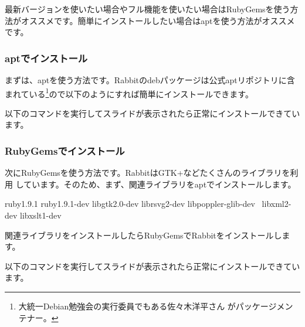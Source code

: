 \documentclass[mingoth,a4paper]{jsarticle}
\begin{document}
最新バージョンを使いたい場合やフル機能を使いたい場合はRubyGemsを使う方
法がオススメです。簡単にインストールしたい場合はaptを使う方法がオススメ
です。

\subsubsection{aptでインストール}

まずは、aptを使う方法です。Rabbitのdebパッケージは公式aptリポジトリに含
まれている\footnote{大統一Debian勉強会の実行委員でもある佐々木洋平さん
がパッケージメンテナー。}ので以下のようにすれば簡単にインストールできます。

\begin{commandline}
\end{commandline}

以下のコマンドを実行してスライドが表示されたら正常にインストールできています。

\begin{commandline}
\end{commandline}

\subsubsection{RubyGemsでインストール}

次にRubyGemsを使う方法です。RabbitはGTK+などたくさんのライブラリを利用
しています。そのため、まず、関連ライブラリをaptでインストールします。

\begin{commandline}
    ruby1.9.1 ruby1.9.1-dev libgtk2.0-dev librsvg2-dev libpoppler-glib-dev \
    libxml2-dev libxslt1-dev
\end{commandline}

関連ライブラリをインストールしたらRubyGemsでRabbitをインストールします。

\begin{commandline}
\end{commandline}

以下のコマンドを実行してスライドが表示されたら正常にインストールできています。

\begin{commandline}
\end{commandline}
\end{document}

